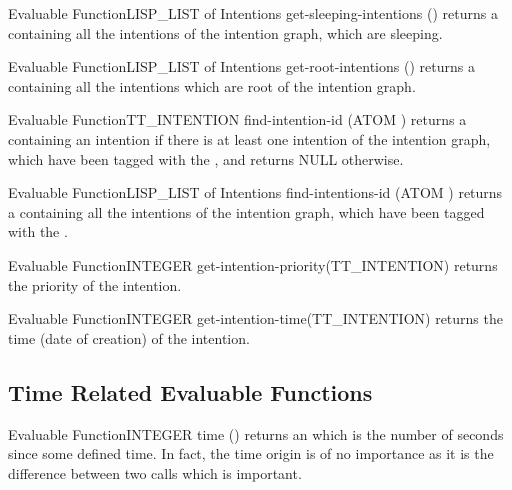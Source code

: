 \begin{typeefa}{Evaluable Function}{LISP\_LIST of Intentions} {get-sleeping-intentions} {()}
returns a  containing all the intentions of the intention graph,
which are sleeping.
\end{typeefa}

\begin{typeefa}{Evaluable Function}{LISP\_LIST of Intentions}  {get-root-intentions} {()}
returns a  containing all the intentions  which are root of the
intention graph.
\end{typeefa}

\begin{typeefa}{Evaluable Function}{TT\_INTENTION} {find-intention-id} {(ATOM
)} 
returns a  containing an intention if there is at least one
intention of the intention graph, which have been tagged with the 
, and returns NULL otherwise.
\end{typeefa}

\begin{typeefa}{Evaluable Function}{LISP\_LIST of Intentions} {find-intentions-id} {(ATOM )}
returns a  containing all the intentions of the intention graph,
which have been tagged with the  .
\end{typeefa}

\begin{typeefa}{Evaluable Function}{INTEGER} {get-intention-priority}{(TT\_INTENTION)}
returns the priority of the intention.
\end{typeefa}

\begin{typeefa}{Evaluable Function}{INTEGER} {get-intention-time}{(TT\_INTENTION)}
returns the time (date of creation) of the intention.
\end{typeefa}

\subsection{Time Related Evaluable Functions}

\begin{typeefa}{Evaluable Function}{INTEGER} {time} {()}
returns an  which is the number of seconds since some defined
time. In fact, the time origin is of no importance as it is the difference
between two calls which is important.
\end{typeefa}

